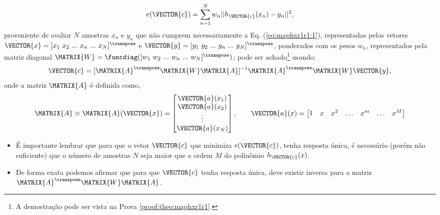 \begin{theorem}
\begin{equation}\label{eq:maphxr1r1:2}
e(\VECTOR{c}) =  \sum_{n=1}^{N} w_n||h_{\VECTOR{c}}(x_n)-y_n||^2,
\end{equation}
proveniente de avaliar $N$ amostras $x_n$ e $y_n$ que não cumprem necessariamente a Eq. (\ref{eq:maphxr1r1:1}), 
representadas pelos vetores $\VECTOR{x}=[x_1~ x_2~ ...~ x_n~ ...~ x_N]^{\transpose}$ e $\VECTOR{y}=[y_1~ y_2~ ...~ y_n~ ...~ y_N]^{\transpose}$,
ponderados com os pesos $w_n$, representados pela matriz diagonal $\MATRIX{W}=\funcdiag([w_1~ w_2~ ...~ w_n~ ...~ w_N]^{\transpose})$;
pode ser achado\footnote{A demostração pode ser vista na Prova \ref{proof:theo:maphxr1r1}.} usando:
\begin{equation}\label{eq:maphxr1r1:3}
\VECTOR{c}=[\MATRIX{A}^{\transpose}\MATRIX{W}\MATRIX{A}]^{-1}\MATRIX{A}^{\transpose}\MATRIX{W}\VECTOR{y},
\end{equation}
onde a matriz $\MATRIX{A}$ é definida como,
\begin{equation}\label{eq:maphxr1r1:4}
\MATRIX{A}\equiv \MATRIX{A}(\VECTOR{x})=\begin{bmatrix}
\VECTOR{a}(x_1)\\
\VECTOR{a}(x_2)\\
\vdots\\
\VECTOR{a}(x_N)\\
\end{bmatrix}, \qquad
\VECTOR{a}(x)=\begin{bmatrix}
1& x& x^2& \hdots & x^m& \hdots& x^M
\end{bmatrix}
\end{equation}

\end{theorem}


\begin{tcbattention}
\begin{itemize}
\item É importante lembrar que para que o vetor $\VECTOR{c}$
que minimiza $e(\VECTOR{c})$, tenha resposta única,
é necessário (porém não suficiente) que o número de amostras $N$ seja maior que a ordem $M$ do polinômio $h_{\VECTOR{c}}(x)$.

\item De forma exata podemos afirmar que para que $\VECTOR{c}$ tenha resposta única,
deve existir inversa para a matriz $\MATRIX{A}^{\transpose}\MATRIX{W}\MATRIX{A}$.

\end{itemize}
\end{tcbattention}


